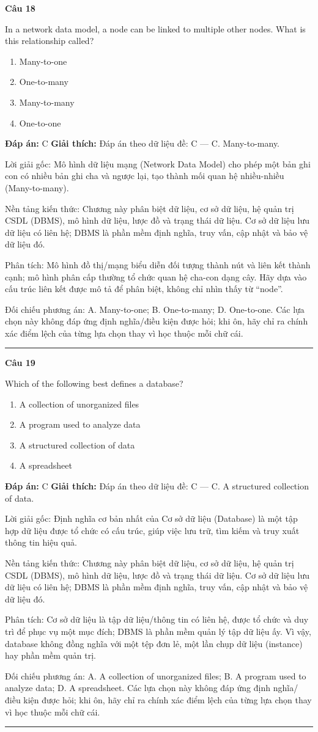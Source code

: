 \documentclass[11pt,a4paper]{article}
\newenvironment{question}[1]{%
  \par\vspace{1em}\noindent\textbf{\large Câu #1}\par\vspace{0.4em}
}{%
  \par\vspace{1em}\hrule\vspace{0.6em}
}
\newenvironment{choices}{%
  \begin{enumerate}[label=\textbf{\Alph*.},leftmargin=2.2em,itemsep=2pt,topsep=3pt]
}{%
  \end{enumerate}
}
\newcommand{\choice}{\item}
\begin{document}
\begin{question}{18}
In a network data model, a node can be linked to multiple other nodes. What is this relationship called?
\begin{choices}
\choice Many-to-one
\choice One-to-many
\choice Many-to-many
\choice One-to-one
\end{choices}
\textbf{Đáp án:} C
\textbf{Giải thích:} Đáp án theo dữ liệu đề: C — C. Many-to-many.

Lời giải gốc: Mô hình dữ liệu mạng (Network Data Model) cho phép một bản ghi con có nhiều bản ghi cha và ngược lại, tạo thành mối quan hệ nhiều-nhiều (Many-to-many).

Nền tảng kiến thức: Chương này phân biệt dữ liệu, cơ sở dữ liệu, hệ quản trị CSDL (DBMS), mô hình dữ liệu, lược đồ và trạng thái dữ liệu. Cơ sở dữ liệu lưu dữ liệu có liên hệ; DBMS là phần mềm định nghĩa, truy vấn, cập nhật và bảo vệ dữ liệu đó.

Phân tích: Mô hình đồ thị/mạng biểu diễn đối tượng thành nút và liên kết thành cạnh; mô hình phân cấp thường tổ chức quan hệ cha-con dạng cây. Hãy dựa vào cấu trúc liên kết được mô tả để phân biệt, không chỉ nhìn thấy từ “node”.

Đối chiếu phương án: A. Many-to-one; B. One-to-many; D. One-to-one. Các lựa chọn này không đáp ứng định nghĩa/điều kiện được hỏi; khi ôn, hãy chỉ ra chính xác điểm lệch của từng lựa chọn thay vì học thuộc mỗi chữ cái.
\end{question}

\begin{question}{19}
Which of the following best defines a database?
\begin{choices}
\choice A collection of unorganized files
\choice A program used to analyze data
\choice A structured collection of data
\choice A spreadsheet
\end{choices}
\textbf{Đáp án:} C
\textbf{Giải thích:} Đáp án theo dữ liệu đề: C — C. A structured collection of data.

Lời giải gốc: Định nghĩa cơ bản nhất của Cơ sở dữ liệu (Database) là một tập hợp dữ liệu được tổ chức có cấu trúc, giúp việc lưu trữ, tìm kiếm và truy xuất thông tin hiệu quả.

Nền tảng kiến thức: Chương này phân biệt dữ liệu, cơ sở dữ liệu, hệ quản trị CSDL (DBMS), mô hình dữ liệu, lược đồ và trạng thái dữ liệu. Cơ sở dữ liệu lưu dữ liệu có liên hệ; DBMS là phần mềm định nghĩa, truy vấn, cập nhật và bảo vệ dữ liệu đó.

Phân tích: Cơ sở dữ liệu là tập dữ liệu/thông tin có liên hệ, được tổ chức và duy trì để phục vụ một mục đích; DBMS là phần mềm quản lý tập dữ liệu ấy. Vì vậy, database không đồng nghĩa với một tệp đơn lẻ, một lần chụp dữ liệu (instance) hay phần mềm quản trị.

Đối chiếu phương án: A. A collection of unorganized files; B. A program used to analyze data; D. A spreadsheet. Các lựa chọn này không đáp ứng định nghĩa/điều kiện được hỏi; khi ôn, hãy chỉ ra chính xác điểm lệch của từng lựa chọn thay vì học thuộc mỗi chữ cái.
\end{question}
\end{document}
